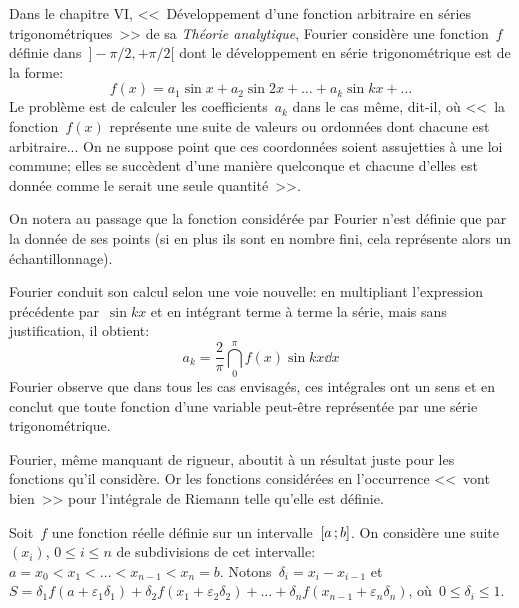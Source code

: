 \medskip
\begin{histoire}%
Dans le chapitre VI, <<~Développement d'une fonction arbitraire en séries
trigonométriques~>> de sa \emph{Théorie analytique}, Fourier
considère une fonction~$f$
définie dans~$]-\pi/2,+\pi/2[$ dont le développement en série trigonométrique est
de la forme:
\begin{equation} f(x)=a_1\sin x+a_2\sin 2x +\ldots+a_k\sin kx +\ldots\end{equation}
Le problème est de calculer les coefficients~$a_k$ dans le cas même, dit-il, où <<~la
fonction~$f(x)$ représente une suite de valeurs ou ordonnées dont chacune est
arbitraire... On ne suppose point que ces coordonnées soient assujetties à une
loi commune; elles se succèdent d'une manière quelconque et chacune d'elles
est donnée comme le serait une seule quantité~>>.

On notera au passage que la fonction considérée par Fourier
n'est définie que par la donnée de ses points (si en plus ils sont en nombre fini, cela représente alors
un échantillonnage).

\medskip
Fourier
conduit son calcul selon une voie nouvelle: en multipliant l'expression précédente
par~$\sin kx$ et en intégrant terme à terme la série, mais sans justification, il obtient:
\begin{equation}a_k=\frac2{\pi}\dint_0^{\pi} f(x)\sin kx \dd x\end{equation}
Fourier
observe que dans tous les cas envisagés, ces intégrales ont un sens et en conclut
que toute fonction d'une variable peut-être représentée par une série trigonométrique.

Fourier,
même manquant de rigueur, aboutit à un résultat juste pour les fonctions
qu'il considère.
Or les fonctions considérées en l'occurrence <<~vont bien~>> pour l'intégrale de Riemann
telle qu'elle est définie.

\medskip
{}
\begin{definition}
Soit~$f$ une fonction réelle définie sur un intervalle~$\mathopen{[}a\,;b\mathclose{]}$.
On considère une suite~$(x_i)$, $0\le i\le n$ de subdivisions de cet intervalle:
$a=x_0 < x_1 <\ldots < x_{n-1} <x_n=b$.
Notons~$\delta_i=x_i-x_{i-1}$ et~$S=\delta_1f(a+\varepsilon_1\delta_1) +
\delta_2 f(x_1+\varepsilon_2\delta_2)+ \ldots + \delta_nf(x_{n-1}+\varepsilon_n\delta_n)$,
où~$0\le \delta_i\le 1$.


\end{definition}
\end{histoire}
